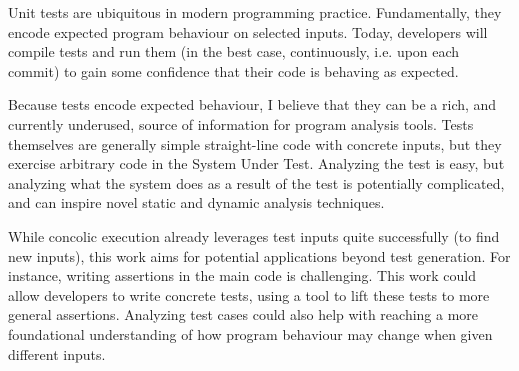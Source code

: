Unit tests are ubiquitous in modern programming practice. Fundamentally, they encode expected program behaviour on selected inputs. Today, developers will compile tests and run them (in the best case, continuously, i.e. upon each commit) to gain some confidence that their code is behaving as expected.

Because tests encode expected behaviour, I believe that they can be a rich, and currently underused, source of information for program analysis tools. Tests themselves are generally simple straight-line code with concrete inputs, but they exercise arbitrary code in the System Under Test. Analyzing the test is easy, but analyzing what the system does as a result of the test is potentially complicated, and can inspire novel static and dynamic analysis techniques. 

While concolic execution already leverages test inputs quite successfully (to find new inputs), this work aims for potential applications beyond test generation. For instance, writing assertions in the main code is challenging. This work could allow developers to write concrete tests, using a tool to lift these tests to more general assertions. Analyzing test cases could also help with reaching a more foundational understanding of how program behaviour may change when given different inputs.
